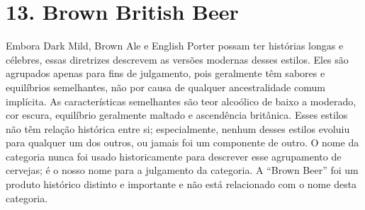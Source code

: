 \section*{13. Brown British Beer}

Embora Dark Mild, Brown Ale e English Porter possam ter histórias longas e célebres, essas diretrizes descrevem as versões modernas desses estilos. Eles são agrupados apenas para fins de julgamento, pois geralmente têm sabores e equilíbrios semelhantes, não por causa de qualquer ancestralidade comum implícita. As características semelhantes são teor alcoólico de baixo a moderado, cor escura, equilíbrio geralmente maltado e ascendência britânica. Esses estilos não têm relação histórica entre si; especialmente, nenhum desses estilos evoluiu para qualquer um dos outros, ou jamais foi um componente de outro. O nome da categoria nunca foi usado historicamente para descrever esse agrupamento de cervejas; é o nosso nome para a julgamento da categoria. A “Brown Beer” foi um produto histórico distinto e importante e não está relacionado com o nome desta categoria.
